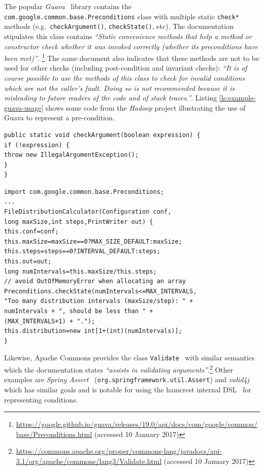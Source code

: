 \documentclass[a4paper,UKenglish]{lipics-v2016}
\begin{document}
The popular \textit{Guava}~\cite{guava} library contains the \texttt{com.\-google.\-common.\-base.\-Preconditi\-ons} class with multiple static \texttt{check*} methods (e.g.\ \texttt{checkArgument()}, \texttt{checkState()}, etc).  The documentation stipulates this class contains \textit{``Static convenience methods that help a method or constructor check whether it was invoked correctly (whether its preconditions have been met)''}. \footnote{\url{https://google.github.io/guava/releases/19.0/api/docs/com/google/common/base/Preconditions.html}  (accessed 10 January 2017)}  The same document also indicates that these methods are not to be used for other checks (including post-condition and invariant checks): \textit{``It is of course possible to use the methods of this class to check for invalid conditions which are not the caller's fault. Doing so is not recommended because it is misleading to future readers of the code and of stack traces.''}.  
Listing \ref{ls:example-guava-usage} shows some code from the \textit{Hadoop} project illustrating the use of Guava to represent a pre-condition.


\begin{lstlisting}[caption=Contract API method defined in \texttt{com.\-google.\-common.\-base.\-Preconditions} (in \textit{Guava 19.0}),frame=tlrb,columns=flexible,label=ls:example-guava]
public static void checkArgument(boolean expression) {
if (!expression) {
throw new IllegalArgumentException();
}
}
\end{lstlisting} 
\begin{lstlisting}[caption=Use of the Guava contract API in \texttt{org.\-apache.\-had\-oop.\-hdfs.\-tools.\-offline\-Image\-Viewer.\-File\-Distribution\-Calculator} 
(in \textit{Hadoop 2.5.0}),frame=tlrb,columns=flexible,label=ls:example-guava-usage]
import com.google.common.base.Preconditions;
...
FileDistributionCalculator(Configuration conf,
long maxSize,int steps,PrintWriter out) {
this.conf=conf;
this.maxSize=maxSize==0?MAX_SIZE_DEFAULT:maxSize;
this.steps=steps==0?INTERVAL_DEFAULT:steps;
this.out=out;
long numIntervals=this.maxSize/this.steps;
// avoid OutOfMemoryError when allocating an array
Preconditions.checkState(numIntervals<=MAX_INTERVALS,
"Too many distribution intervals (maxSize/step): " + 
numIntervals + ", should be less than " + 
(MAX_INTERVALS+1) + ".");
this.distribution=new int[1+(int)(numIntervals)];
}
\end{lstlisting}

Likewise, Apache Commons provides the class \texttt{Validate}~\cite{commonsvalidate} with similar semantics which the documentation states \textit{``assists in validating arguments''}.\footnote{\url{https://commons.apache.org/proper/commons-lang/javadocs/api-3.1/org/apache/commons/lang3/Validate.html}  (accessed 10 January 2017)} Other examples are \textit{Spring Assert}~\cite{springframework} (\texttt{org.\-springframework.\-util.\-As\-sert}) and \textit{valid4j}~\cite{valid4j} which has similar goals and is notable for using the hamcrest internal DSL~\cite{hamcrest} for representing conditions. 
\end{document}
